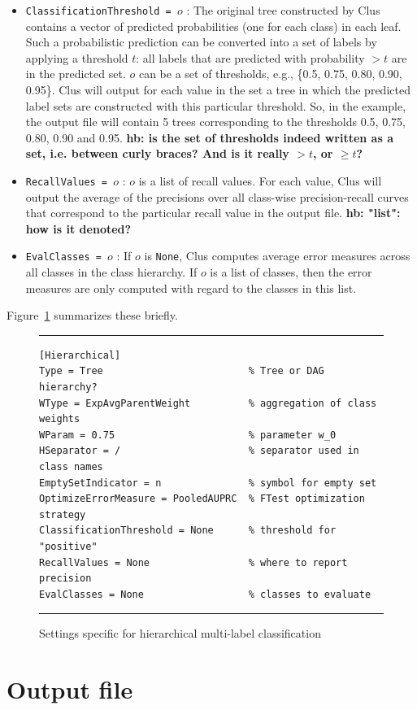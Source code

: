 \documentclass[a4paper]{report}
\begin{document}
\begin{itemize}
\item {\tt ClassificationThreshold = $o$} : The original tree constructed by Clus contains a vector of predicted probabilities (one for each class) in each leaf. Such a probabilistic prediction can be converted into a set of labels by applying a threshold $t$: all labels that are predicted with probability $> t$ are in the predicted set.  $o$ can be a set of thresholds, e.g., \{0.5, 0.75, 0.80, 0.90, 0.95\}. Clus will output for each value in the set a tree in which the predicted label sets are constructed with this particular threshold. So, in the example, the output file will contain 5 trees corresponding to the thresholds 0.5, 0.75, 0.80, 0.90 and 0.95.
{\bf * hb: is the set of thresholds indeed written as a set, i.e. between curly braces?  And is it really $>t$, or $\geq t$?}
\item {\tt RecallValues = $o$} : $o$ is a list of recall values. For each value, Clus will output the average of the precisions over all class-wise precision-recall curves that correspond to the particular recall value in the output file.
{\bf * hb: "list": how is it denoted?}
\item {\tt EvalClasses = $o$} : If $o$ is {\tt None}, Clus computes average error measures across all classes in the class  hierarchy. If $o$ is a list of classes, then the error measures are only computed with regard to the classes in this list.
\end{itemize}

Figure~\ref{settings-hmc:fig} summarizes these briefly.

\begin{figure}
\hrule
\begin{verbatim}
[Hierarchical]
Type = Tree                         % Tree or DAG hierarchy?
WType = ExpAvgParentWeight          % aggregation of class weights
WParam = 0.75                       % parameter w_0
HSeparator = /                      % separator used in class names
EmptySetIndicator = n               % symbol for empty set
OptimizeErrorMeasure = PooledAUPRC  % FTest optimization strategy
ClassificationThreshold = None      % threshold for "positive"
RecallValues = None                 % where to report precision
EvalClasses = None                  % classes to evaluate
\end{verbatim}
\hrule
\caption{Settings specific for hierarchical multi-label classification}
\label{settings-hmc:fig}
\end{figure}

\chapter{Output file}
\end{document}
